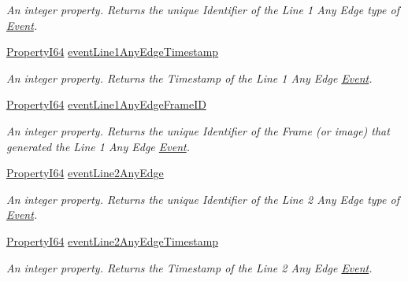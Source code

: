 \begin{DoxyCompactItemize}
\begin{DoxyCompactList}\small\item\em An integer property. Returns the unique Identifier of the Line 1 Any Edge type of \hyperlink{classmv_i_m_p_a_c_t_1_1acquire_1_1_event}{Event}. \end{DoxyCompactList}\item 
\hyperlink{group___common_interface_ga81749b2696755513663492664a18a893}{Property\+I64} \hyperlink{classmv_i_m_p_a_c_t_1_1acquire_1_1_gen_i_cam_1_1_event_control_af7e100fbb973becc95b2f8b6fbb865a8}{event\+Line1\+Any\+Edge\+Timestamp}
\begin{DoxyCompactList}\small\item\em An integer property. Returns the Timestamp of the Line 1 Any Edge \hyperlink{classmv_i_m_p_a_c_t_1_1acquire_1_1_event}{Event}. \end{DoxyCompactList}\item 
\hyperlink{group___common_interface_ga81749b2696755513663492664a18a893}{Property\+I64} \hyperlink{classmv_i_m_p_a_c_t_1_1acquire_1_1_gen_i_cam_1_1_event_control_a58b2f335c89fe2fee4095f73374b6a98}{event\+Line1\+Any\+Edge\+Frame\+I\+D}
\begin{DoxyCompactList}\small\item\em An integer property. Returns the unique Identifier of the Frame (or image) that generated the Line 1 Any Edge \hyperlink{classmv_i_m_p_a_c_t_1_1acquire_1_1_event}{Event}. \end{DoxyCompactList}\item 
\hyperlink{group___common_interface_ga81749b2696755513663492664a18a893}{Property\+I64} \hyperlink{classmv_i_m_p_a_c_t_1_1acquire_1_1_gen_i_cam_1_1_event_control_ac9af1d51d92d43cba36bac2ffc65e8c3}{event\+Line2\+Any\+Edge}
\begin{DoxyCompactList}\small\item\em An integer property. Returns the unique Identifier of the Line 2 Any Edge type of \hyperlink{classmv_i_m_p_a_c_t_1_1acquire_1_1_event}{Event}. \end{DoxyCompactList}\item 
\hyperlink{group___common_interface_ga81749b2696755513663492664a18a893}{Property\+I64} \hyperlink{classmv_i_m_p_a_c_t_1_1acquire_1_1_gen_i_cam_1_1_event_control_abf4d857e7c167e6b1979f78970387fa6}{event\+Line2\+Any\+Edge\+Timestamp}
\begin{DoxyCompactList}\small\item\em An integer property. Returns the Timestamp of the Line 2 Any Edge \hyperlink{classmv_i_m_p_a_c_t_1_1acquire_1_1_event}{Event}. \end{DoxyCompactList}\item 

\end{DoxyCompactItemize}
